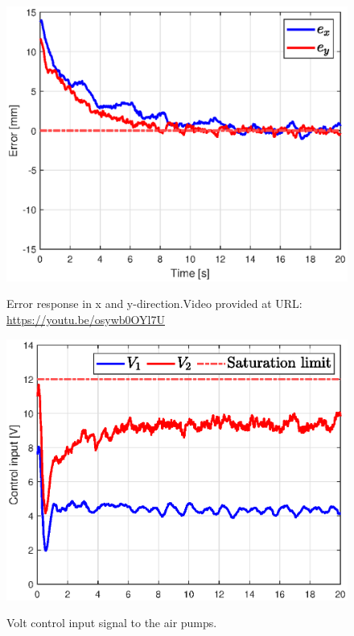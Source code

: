 \begin{figure}[H] 
    \begin{minipage}[b]{0.49\linewidth}
     \centering
    \includegraphics[width=\linewidth]{Figures/Chapter5/errorstepright.eps} 
    \caption{Error response in x and y-direction.Video provided at URL: \url{https://youtu.be/osywb0OYl7U}} 
    \label{fig5:errorswingright} 
       \end{minipage} 
    \begin{minipage}[b]{0.49\linewidth}
     \centering
    \includegraphics[width=\linewidth]{Figures/Chapter5/controlinputsteprightV.eps} 
    \caption{Volt control input signal to the air pumps.} 
    \vspace{12pt}
    \label{fig5:inputswingright} 
    \end{minipage} 
\end{figure}


